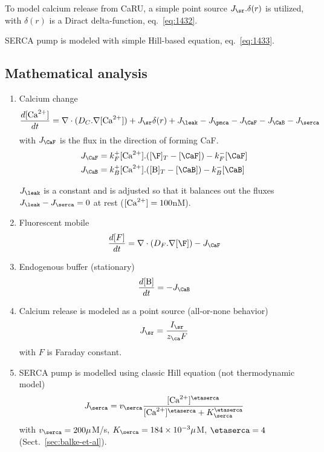 % 

To model calcium release from CaRU, a simple point source
$J_\sr.\delta(r)$ is utilized, with $\delta(r)$ is a Diract
delta-function, eq.~\eqref{eq:1432}. 

SERCA pump is modeled with simple Hill-based equation,
eq.~\eqref{eq:1433}. 



\subsection{Mathematical analysis}
\label{sec:math-analys-4}

\begin{enumerate}
\item Calcium change
\begin{equation}
  \label{eq:1425}
  \frac{d[\Ca]}{dt} = \nabla\cdot(D_C.\nabla [\Ca]) + J_\sr \delta(r) + J_\leak
  - J_\pmca - J_\CaF - J_\CaB - J_\serca
\end{equation}
with $J_\CaF$ is the flux in the direction of forming CaF.
\begin{equation}
  \label{eq:1426}
  \begin{split}
    J_\CaF &= k_F^+[\Ca].([\F]_T-[\CaF]) - k_F^- [\CaF]\\
    J_\CaB &= k_B^+[\Ca].([\B]_T-[\CaB]) - k_B^- [\CaB]\\
  \end{split}
\end{equation}

$J_\leak$ is a constant and is adjusted so that it balances out the fluxes
$J_\leak-J_\serca =0$ at rest ($[{\text{Ca}^{2+}}]=100$nM). 

\item Fluorescent mobile
  \begin{equation}
    \label{eq:1427}
    \frac{d[F]}{dt} =  \nabla\cdot(D_F.\nabla [\F]) - J_\CaF
  \end{equation}

\item Endogenous buffer (stationary)
  \begin{equation}
    \label{eq:1428}
    \frac{d[\B]}{dt} = - J_\CaB
  \end{equation}

\item Calcium release is modeled as a point source (all-or-none
  behavior)
  \begin{equation}
    \label{eq:1432}
    J_\sr = \frac{I_\sr}{z_\ca F}
  \end{equation}
with $F$ is Faraday constant.
\item SERCA pump is modelled using classic Hill equation (not
  thermodynamic model)
  \begin{equation}
    \label{eq:1433}
    J_\serca = v_\serca \frac{[\Ca]^\etaserca}{[\Ca]^\etaserca+K_\serca^\etaserca}
  \end{equation}
  with $v_\serca = 200\mu$M/s, $K_\serca=184\times 10^{-3}\mu$M,
  $\etaserca=4$~\citep{balke1994} (Sect.~\ref{sec:balke-et-al}).
\end{enumerate}
